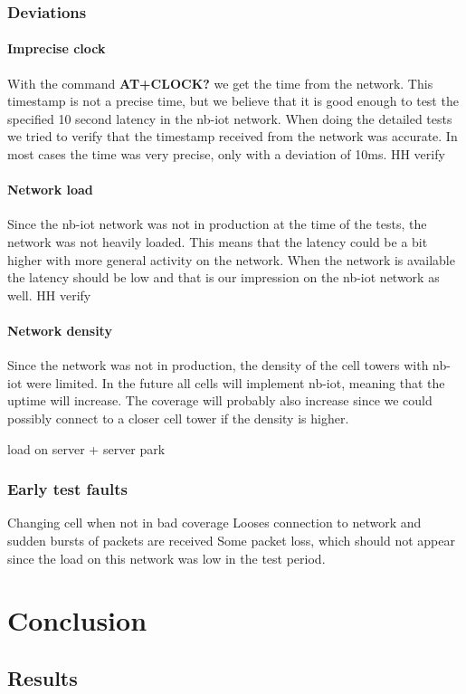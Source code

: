 \documentclass[USenglish]{ifimaster}  %
\begin{document}
\section{Deviations} \label{section:deviations}
\subsection{Imprecise clock}
With the command \textbf{AT+CLOCK?} we get the time from the network. This timestamp is not a precise time, but we believe that it is good enough to test the specified 10 second latency in the \acrshort{nb-iot} network. When doing the detailed tests we tried to verify that the timestamp received from the network was accurate. In most cases the time was very precise, only with a deviation of 10ms. HH verify

\subsection{Network load}
Since the \acrshort{nb-iot} network was not in production at the time of the tests, the network was not heavily loaded. This means that the latency could be a bit higher with more general activity on the network. When the network is available the latency should be low and that is our impression on the \acrshort{nb-iot} network as well. HH verify

\subsection{Network density}
Since the network was not in production, the density of the cell towers with \acrshort{nb-iot} were limited. In the future all cells will implement \acrshort{nb-iot}, meaning that the uptime will increase. The coverage will probably also increase since we could possibly connect to a closer cell tower if the density is higher.

load on server + server park

\section{Early test faults}
Changing cell when not in bad coverage
Looses connection to network and sudden bursts of packets are received
Some packet loss, which should not appear since the load on this network was low in the test period.


\part{Conclusion}                     %

\chapter{Results}                     %


\backmatter{}
\printbibliography
\printglossary[type=\acronymtype]
\end{document}
